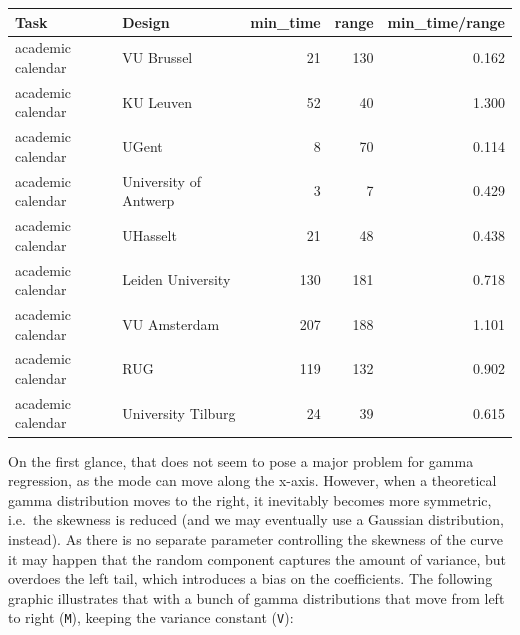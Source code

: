 \documentclass[]{svmono}
\theoremstyle{definition}
\theoremstyle{definition}
\theoremstyle{definition}
\theoremstyle{remark}
\begin{document}
\begin{tabular}{l|l|r|r|r}
\hline
Task & Design & min\_time & range & min\_time/range\\
\hline
academic calendar & VU Brussel & 21 & 130 & 0.162\\
\hline
academic calendar & KU Leuven & 52 & 40 & 1.300\\
\hline
academic calendar & UGent & 8 & 70 & 0.114\\
\hline
academic calendar & University of Antwerp & 3 & 7 & 0.429\\
\hline
academic calendar & UHasselt & 21 & 48 & 0.438\\
\hline
academic calendar & Leiden University & 130 & 181 & 0.718\\
\hline
academic calendar & VU Amsterdam & 207 & 188 & 1.101\\
\hline
academic calendar & RUG & 119 & 132 & 0.902\\
\hline
academic calendar & University Tilburg & 24 & 39 & 0.615\\
\hline
\end{tabular}

On the first glance, that does not seem to pose a major problem for
gamma regression, as the mode can move along the x-axis. However, when a
theoretical gamma distribution moves to the right, it inevitably becomes
more symmetric, i.e.~the skewness is reduced (and we may eventually use
a Gaussian distribution, instead). As there is no separate parameter
controlling the skewness of the curve it may happen that the random
component captures the amount of variance, but overdoes the left tail,
which introduces a bias on the coefficients. The following graphic
illustrates that with a bunch of gamma distributions that move from left
to right (\texttt{M}), keeping the variance constant (\texttt{V}):
\end{document}
